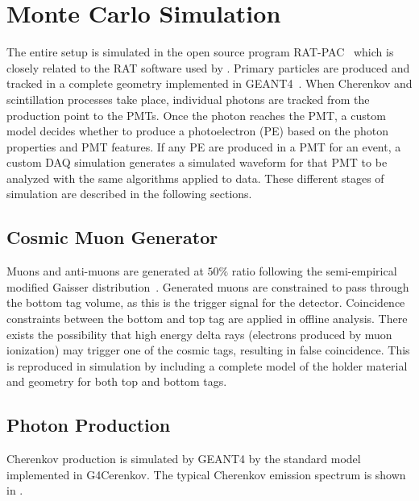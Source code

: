 \section{Monte Carlo Simulation}
\label{sec:simulation}

The entire setup is simulated in the open source program RAT-PAC~\cite{ratpac} which is closely related to the RAT software used by {\snop}. 
Primary particles are produced and tracked in a complete geometry implemented in GEANT4~\cite{geant4}. 
When Cherenkov and scintillation processes take place, individual photons are tracked from the production point to the PMTs. 
Once the photon reaches the PMT, a custom model decides whether to produce a photoelectron (PE) based on the photon properties and PMT features. 
If any PE are produced in a PMT for an event, a custom DAQ simulation generates a simulated waveform for that PMT to be analyzed with the same algorithms applied to data.
These different stages of simulation are described in the following sections.

\subsection{Cosmic Muon Generator}
\label{sec:primarygen}

Muons and anti-muons are generated at $50\%$ ratio following the semi-empirical modified Gaisser distribution~\cite{gaisser-mod}. 
Generated muons are constrained to pass through the bottom tag volume, as this is the trigger signal for the detector. 
Coincidence constraints between the bottom and top tag are applied in offline analysis.
There exists the possibility that high energy delta rays (electrons produced by muon ionization) may trigger one of the cosmic tags, resulting in false coincidence.
This is reproduced in simulation by including a complete model of the holder material and geometry for both top and bottom tags.

\subsection{Photon Production \label{sec:photon_prod}}

Cherenkov production is simulated by GEANT4 by the standard model implemented in G4Cerenkov. 
The typical Cherenkov emission spectrum is shown in .


